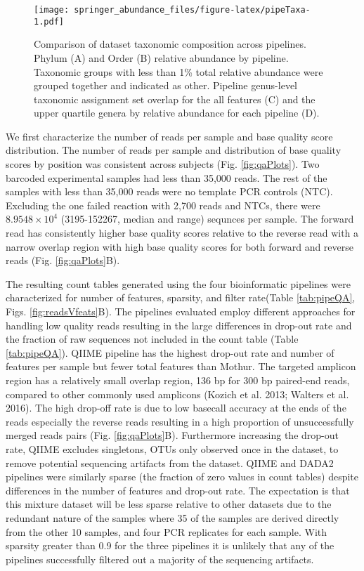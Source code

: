 \documentclass[smallextended]{svjour3}       %
\begin{document}
\begin{figure}
\centering
\texttt{[image: springer\_abundance\_files/figure-latex/pipeTaxa-1.pdf]}
\caption{\label{fig:pipeTaxa}Comparison of dataset taxonomic composition
across pipelines. Phylum (A) and Order (B) relative abundance by
pipeline. Taxonomic groups with less than 1\% total relative abundance
were grouped together and indicated as other. Pipeline genus-level
taxonomic assignment set overlap for the all features (C) and the upper
quartile genera by relative abundance for each pipeline (D).}
\end{figure}

We first characterize the number of reads per sample and base quality
score distribution. The number of reads per sample and distribution of
base quality scores by position was consistent across subjects (Fig.
\ref{fig:qaPlots}). Two barcoded experimental samples had less than
35,000 reads. The rest of the samples with less than 35,000 reads were
no template PCR controls (NTC). Excluding the one failed reaction with
2,700 reads and NTCs, there were \(8.9548\times 10^{4}\) (3195-152267,
median and range) sequnces per sample. The forward read has consistently
higher base quality scores relative to the reverse read with a narrow
overlap region with high base quality scores for both forward and
reverse reads (Fig. \ref{fig:qaPlots}B).

The resulting count tables generated using the four bioinformatic
pipelines were characterized for number of features, sparsity, and
filter rate(Table \ref{tab:pipeQA}, Figs. \ref{fig:readsVfeats}B). The
pipelines evaluated employ different approaches for handling low quality
reads resulting in the large differences in drop-out rate and the
fraction of raw sequences not included in the count table (Table
\ref{tab:pipeQA}). QIIME pipeline has the highest drop-out rate and
number of features per sample but fewer total features than Mothur. The
targeted amplicon region has a relatively small overlap region, 136 bp
for 300 bp paired-end reads, compared to other commonly used amplicons
(Kozich et al. 2013; Walters et al. 2016). The high drop-off rate is due
to low basecall accuracy at the ends of the reads especially the reverse
reads resulting in a high proportion of unsuccessfully merged reads
pairs (Fig. \ref{fig:qaPlots}B). Furthermore increasing the drop-out
rate, QIIME excludes singletons, OTUs only observed once in the dataset,
to remove potential sequencing artifacts from the dataset. QIIME and
DADA2 pipelines were similarly sparse (the fraction of zero values in
count tables) despite differences in the number of features and drop-out
rate. The expectation is that this mixture dataset will be less sparse
relative to other datasets due to the redundant nature of the samples
where 35 of the samples are derived directly from the other 10 samples,
and four PCR replicates for each sample. With sparsity greater than 0.9
for the three pipelines it is unlikely that any of the pipelines
successfully filtered out a majority of the sequencing artifacts.
\end{document}
